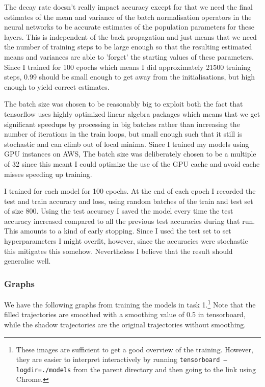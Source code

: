 \documentclass{article}
\begin{document}
The decay rate doesn't really impact accuracy except for that we need the final
estimates of the mean and variance of the batch normalisation operators in the
neural networks to be accurate estimates of the population parameters for these
layers. This is independent of the back propagation and just means that we need the
number of training steps to be large enough so that the resulting estimated
means and variances are able to 'forget' the starting values of these
parameters. Since I trained for 100 epochs which means I did approximately 21500
training steps, 0.99 should be small enough to get away from the
initialisations, but high enough to yield correct estimates.

The batch size was chosen to be reasonably big to exploit both the fact that
tensorflow uses highly optimized linear algebra packages which
means that we get significant speedups by processing in big batches rather than
increasing the number of iterations in the train loops, but small enough such
that it still is stochastic and can climb out of local minima. Since I trained
my models using GPU instances on AWS, The batch size
was deliberately chosen to be a multiple of 32 since this meant I could optimize
the use of the GPU cache and avoid cache misses speeding up training.

I trained for each model for 100 epochs. At the end of each epoch I recorded the
test and train accuracy and loss, using random batches of the train and test set
of size 800. Using the test accuracy I saved the model every time the test
accuracy increased compared to all the previous test accuracies during that run.
This amounts to a kind of early stopping. Since I used the test set to set
hyperparameters I might overfit, however, since the accuracies were stochastic
this mitigates this somehow. Nevertheless I believe that the result should
generalise well.

\subsubsection{Graphs}

We have the following graphs from training the models in task 1.\footnote{These images are
sufficient to get a good overview of the training. However, they are easier to
interpret interactively by running \texttt{tensorboard
  --logdir=./models} from the parent directory and then going to the
link using Chrome.} Note that the filled trajectories are smoothed with a
smoothing value of 0.5 in tensorboard, while the shadow trajectories are the
original trajectories without smoothing.
\end{document}
